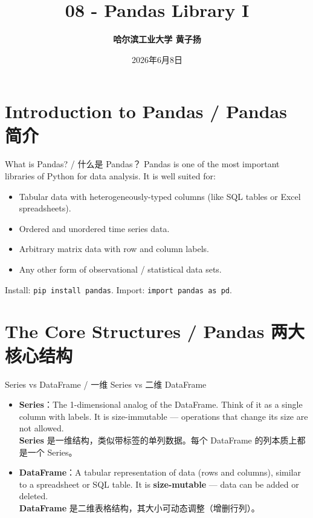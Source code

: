 \documentclass[11pt,a4paper]{article}
\title{\Huge \bfseries 08 - Pandas Library I}
\author{\Large \textbf{哈尔滨工业大学 \quad 黄子扬}}
\date{2026年6月8日}
\begin{document}
\maketitle
\tableofcontents
\newpage

\section{Introduction to Pandas / Pandas 简介}

\begin{concept}{What is Pandas? / 什么是 Pandas？}
    Pandas is one of the most important libraries of Python for data analysis. It is well suited for:
    \begin{itemize}[itemsep=0.3em]
        \item Tabular data with heterogeneously-typed columns (like SQL tables or Excel spreadsheets).
        \item Ordered and unordered time series data.
        \item Arbitrary matrix data with row and column labels.
        \item Any other form of observational / statistical data sets.
    \end{itemize}
    Install: \texttt{pip install pandas}. Import: \texttt{import pandas as pd}.
\end{concept}

\section{The Core Structures / Pandas 两大核心结构}

\begin{concept}{Series vs DataFrame / 一维 Series vs 二维 DataFrame}
    \begin{itemize}[itemsep=0.5em]
        \item \textbf{Series}：The 1-dimensional analog of the DataFrame. Think of it as a single column with labels. It is size-immutable — operations that change its size are not allowed. \\
        \textbf{Series} 是一维结构，类似带标签的单列数据。每个 DataFrame 的列本质上都是一个 Series。
        \item \textbf{DataFrame}：A tabular representation of data (rows and columns), similar to a spreadsheet or SQL table. It is \textbf{size-mutable} — data can be added or deleted. \\
        \textbf{DataFrame} 是二维表格结构，其大小可动态调整（增删行列）。
    \end{itemize}
\end{concept}
\end{document}
